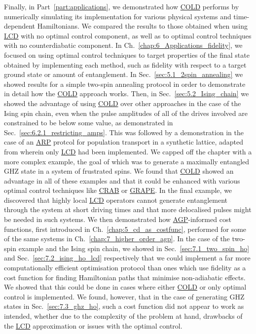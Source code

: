 \documentclass[a4paper,oneside,11pt]{book}
\newcommand{\acrref}[1]{\hyperref[acr:#1]{#1}}
\begin{document}
Finally, in Part~\ref{part:applications}, we demonstrated how \acrref{COLD} performs by numerically simulating its implementation for various physical systems and time-dependent Hamiltonians. We compared the results to those obtained when using \acrref{LCD} with no optimal control component, as well as to optimal control techniques with no counterdiabatic component. In Ch.~\ref{chap:6_Applications_fidelity}, we focused on using optimal control techniques to target properties of the final state obtained by implementing each method, such as fidelity with respect to a target ground state or amount of entanglement. In Sec.~\ref{sec:5.1_2spin_annealing} we showed results for a simple two-spin annealing protocol in order to demonstrate in detail how the \acrref{COLD} approach works. Then, in Sec.~\ref{sec:5.2_Ising_chain} we showed the advantage of using \acrref{COLD} over other approaches in the case of the Ising spin chain, even when the pulse amplitudes of all of the drives involved are constrained to be below some value, as demonstrated in Sec.~\ref{sec:6.2.1_restricting_amps}. This was followed by a demonstration in the case of an \acrref{ARP} protcol for population transport in a synthetic lattice, adapted from \cite{meier_counterdiabatic_2020} wherein only \acrref{LCD} had been implemented. We capped off the chapter with a more complex example, the goal of which was to generate a maximally entangled GHZ state in a system of frustrated spins. We found that \acrref{COLD} showed an advantage in all of these examples and that it could be enhanced with various optimal control techniques like \acrref{CRAB} or \acrref{GRAPE}. In the final example, we discovered that highly local \acrref{LCD} operators cannot generate entanglement through the system at short driving times and that more delocalised pulses might be needed in such systems. We then demonstrated how \acrref{AGP}-informed cost functions, first introduced in Ch.~\ref{chap:5_cd_as_costfunc}, performed for some of the same systems in Ch.~\ref{chap:7_higher_order_agp}. In the case of the two-spin example and the Ising spin chain, we showed in Sec.~\ref{sec:7.1_two_spin_ho} and Sec.~\ref{sec:7.2_ising_ho_lcd} respectively that we could implement a far more computationally efficient optimisation protocol than ones which use fidelity as a cost function for finding Hamiltonian paths that minimise non-adiabatic effects. We showed that this could be done in cases where either \acrref{COLD} or only optimal control is implemented. We found, however, that in the case of generating GHZ states in Sec.~\ref{sec:7.3_ghz_ho}, such a cost function did not appear to work as intended, whether due to the complexity of the problem at hand, drawbacks of the \acrref{LCD} approximation or issues with the optimal control. 
\end{document}
